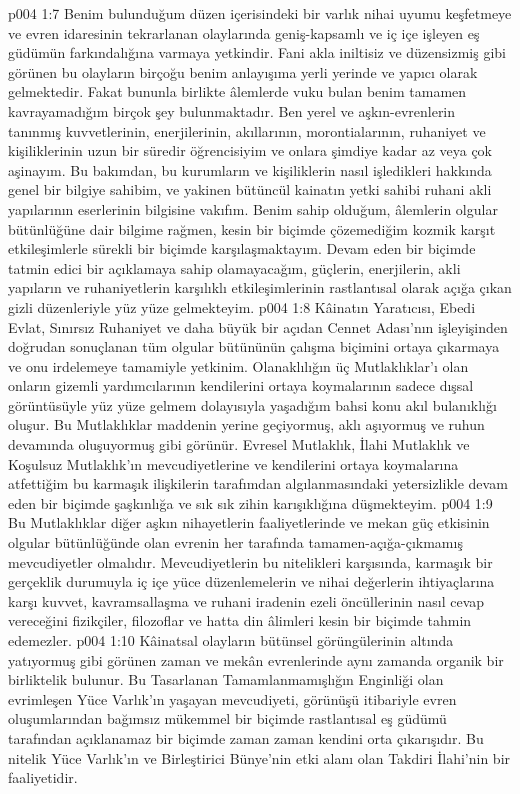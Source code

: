 \vs p004 1:7 Benim bulunduğum düzen içerisindeki bir varlık nihai uyumu keşfetmeye ve evren idaresinin tekrarlanan olaylarında geniş\hyp{}kapsamlı ve iç içe işleyen eş güdümün farkındalığına varmaya yetkindir. Fani akla iniltisiz ve düzensizmiş gibi görünen bu olayların birçoğu benim anlayışıma yerli yerinde ve yapıcı olarak gelmektedir. Fakat bununla birlikte âlemlerde vuku bulan benim tamamen kavrayamadığım birçok şey bulunmaktadır. Ben yerel ve aşkın\hyp{}evrenlerin tanınmış kuvvetlerinin, enerjilerinin, akıllarının, morontialarının, ruhaniyet ve kişiliklerinin uzun bir süredir öğrencisiyim ve onlara şimdiye kadar az veya çok aşinayım. Bu bakımdan, bu kurumların ve kişiliklerin nasıl işledikleri hakkında genel bir bilgiye sahibim, ve yakinen bütüncül kainatın yetki sahibi ruhani akli yapılarının eserlerinin bilgisine vakıfım. Benim sahip olduğum, âlemlerin olgular bütünlüğüne dair bilgime rağmen, kesin bir biçimde çözemediğim kozmik karşıt etkileşimlerle sürekli bir biçimde karşılaşmaktayım. Devam eden bir biçimde tatmin edici bir açıklamaya sahip olamayacağım, güçlerin, enerjilerin, akli yapıların ve ruhaniyetlerin karşılıklı etkileşimlerinin rastlantısal olarak açığa çıkan gizli düzenleriyle yüz yüze gelmekteyim.
\vs p004 1:8 Kâinatın Yaratıcısı, Ebedi Evlat, Sınırsız Ruhaniyet ve daha büyük bir açıdan Cennet Adası’nın işleyişinden doğrudan sonuçlanan tüm olgular bütününün çalışma biçimini ortaya çıkarmaya ve onu irdelemeye tamamiyle yetkinim. Olanaklılığın üç Mutlaklıklar’ı olan onların gizemli yardımcılarının kendilerini ortaya koymalarının sadece dışsal görüntüsüyle yüz yüze gelmem dolayısıyla yaşadığım bahsi konu akıl bulanıklığı oluşur. Bu Mutlaklıklar maddenin yerine geçiyormuş, aklı aşıyormuş ve ruhun devamında oluşuyormuş gibi görünür. Evresel Mutlaklık, İlahi Mutlaklık ve Koşulsuz Mutlaklık’ın mevcudiyetlerine ve kendilerini ortaya koymalarına atfettiğim bu karmaşık ilişkilerin tarafımdan algılanmasındaki yetersizlikle devam eden bir biçimde şaşkınlığa ve sık sık zihin karışıklığına düşmekteyim.
\vs p004 1:9 Bu Mutlaklıklar diğer aşkın nihayetlerin faaliyetlerinde ve mekan güç etkisinin olgular bütünlüğünde olan evrenin her tarafında tamamen\hyp{}açığa\hyp{}çıkmamış mevcudiyetler olmalıdır. Mevcudiyetlerin bu nitelikleri karşısında, karmaşık bir gerçeklik durumuyla iç içe yüce düzenlemelerin ve nihai değerlerin ihtiyaçlarına karşı kuvvet, kavramsallaşma ve ruhani iradenin ezeli öncüllerinin nasıl cevap vereceğini fizikçiler, filozoflar ve hatta din âlimleri kesin bir biçimde tahmin edemezler.
\vs p004 1:10 Kâinatsal olayların bütünsel görüngülerinin altında yatıyormuş gibi görünen zaman ve mekân evrenlerinde aynı zamanda organik bir birliktelik bulunur. Bu Tasarlanan Tamamlanmamışlığın Enginliği olan evrimleşen Yüce Varlık’ın yaşayan mevcudiyeti, görünüşü itibariyle evren oluşumlarından bağımsız mükemmel bir biçimde rastlantısal eş güdümü tarafından açıklanamaz bir biçimde zaman zaman kendini orta çıkarışıdır. Bu nitelik Yüce Varlık’ın ve Birleştirici Bünye’nin etki alanı olan Takdiri İlahi’nin bir faaliyetidir.
